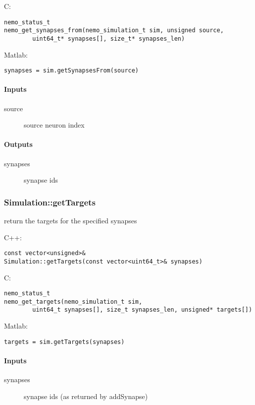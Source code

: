\noindent C:
\begin{lstlisting}[aboveskip=2pt]
nemo_status_t
nemo_get_synapses_from(nemo_simulation_t sim, unsigned source, 
        uint64_t* synapses[], size_t* synapses_len)
\end{lstlisting}

\noindent Matlab:
\begin{lstlisting}[aboveskip=2pt]
synapses = sim.getSynapsesFrom(source)
\end{lstlisting}
\paragraph{Inputs}
\begin{description}
\item[source] source neuron index
\end{description}
\paragraph{Outputs}
\begin{description}
\item[synapses] synapse ids
\end{description}

\clearpage
\subsubsection*{Simulation::getTargets}
\label{fn: getTargets}
return the targets for the specified synapses


\noindent C++:
\begin{lstlisting}[aboveskip=2pt]
const vector<unsigned>&
Simulation::getTargets(const vector<uint64_t>& synapses)
\end{lstlisting}

\noindent C:
\begin{lstlisting}[aboveskip=2pt]
nemo_status_t
nemo_get_targets(nemo_simulation_t sim, 
        uint64_t synapses[], size_t synapses_len, unsigned* targets[])
\end{lstlisting}

\noindent Matlab:
\begin{lstlisting}[aboveskip=2pt]
targets = sim.getTargets(synapses)
\end{lstlisting}
\paragraph{Inputs}
\begin{description}
\item[synapses] synapse ids (as returned by addSynapse)
\end{description}
